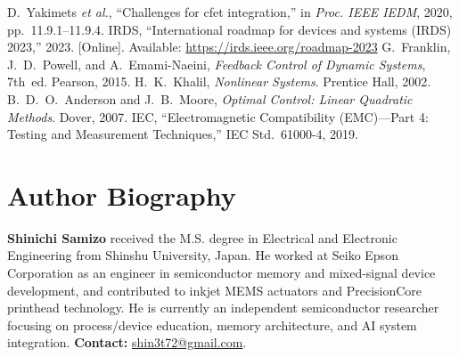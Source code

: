 \documentclass[conference]{IEEEtran}
\begin{document}
\begin{thebibliography}{6}
 D.~Yakimets \emph{et al.}, ``Challenges for cfet integration,'' in \emph{Proc. IEEE IEDM}, 2020, pp.~11.9.1--11.9.4.
 IRDS, ``International roadmap for devices and systems (IRDS) 2023,'' 2023. [Online]. Available: \url{https://irds.ieee.org/roadmap-2023}
 G.~Franklin, J.~D.~Powell, and A.~Emami-Naeini, \emph{Feedback Control of Dynamic Systems}, 7th~ed. Pearson, 2015.
 H.~K.~Khalil, \emph{Nonlinear Systems}. Prentice Hall, 2002.
 B.~D.~O.~Anderson and J.~B.~Moore, \emph{Optimal Control: Linear Quadratic Methods}. Dover, 2007.
 IEC, ``Electromagnetic Compatibility (EMC)---Part 4: Testing and Measurement Techniques,'' IEC Std.~61000-4, 2019.
\end{thebibliography}

\section*{Author Biography}
\textbf{Shinichi Samizo} received the M.S. degree in Electrical and Electronic Engineering from Shinshu University, Japan. He worked at Seiko Epson Corporation as an engineer in semiconductor memory and mixed-signal device development, and contributed to inkjet MEMS actuators and PrecisionCore printhead technology. He is currently an independent semiconductor researcher focusing on process/device education, memory architecture, and AI system integration. \textbf{Contact:} \href{mailto:shin3t72@gmail.com}{shin3t72@gmail.com}.
\end{document}
